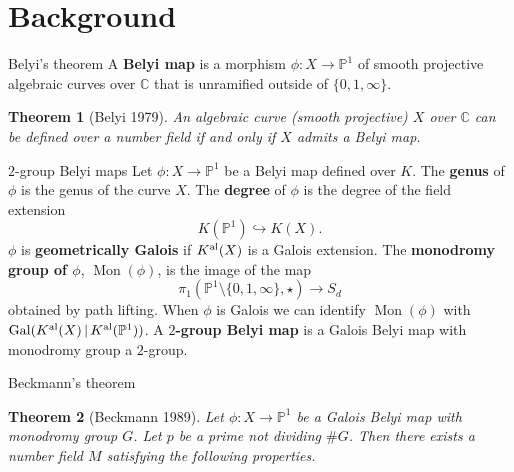 \documentclass[handout,xcolor=dvipsnames]{beamer}
\theoremstyle{plain}
\newtheorem*{thm}{Theorem}
\newcommand{\PP}{\mathbb P}
\newcommand{\CC}{\mathbb C}
\newcommand{\Kal}{{{K}^{\textup{al}}}}
\DeclareMathOperator{\Mon}{Mon}
\DeclareMathOperator{\Gal}{Gal}
\begin{document}
  \section{Background}{
    \begin{frame}{Belyi's theorem}
      A \textbf{Belyi map}
      is a morphism
      $\phi\colon X\to\PP^1$
      of smooth projective algebraic curves
      over $\CC$
      that is unramified outside of
      $\{0,1,\infty\}$.
      \pause
      \begin{thm}[Belyi 1979]
        \vspace{1pt}
        An algebraic curve (smooth projective)
        $X$ over $\CC$ can be defined over a number
        field if and only if $X$ admits a
        Belyi map.
      \end{thm}
    \end{frame}
    \begin{frame}{$2$-group Belyi maps}
      Let $\phi\colon X\to\PP^1$ be a Belyi map
      defined over $K$.
      \pause\newline
      The \textbf{genus} of $\phi$ is the genus
      of the curve $X$.
      \pause\newline
      The \textbf{degree} of $\phi$
      is the degree of the field extension
      \[
        K(\PP^1)\hookrightarrow K(X).
      \]
      \pause
      $\phi$ is \textbf{geometrically Galois}
      if $\Kal(X)$ is a Galois extension.
      \pause\newline
      The \textbf{monodromy group of $\phi$},
      $\Mon(\phi)$,
      is the image of the map
      \[
        \pi_1(\PP^1\setminus\{0,1,\infty\},\star)
        \to S_d
      \]
      obtained by path lifting.
      \pause\newline
      When $\phi$ is Galois we
      can identify $\Mon(\phi)$ with
      $\Gal(\Kal(X)\,|\,\Kal(\PP^1))$.
      \pause\newline
      A \textbf{$2$-group Belyi map} is a
      Galois Belyi map with monodromy group
      a $2$-group.
    \end{frame}
    \begin{frame}{Beckmann's theorem}
      \begin{thm}[Beckmann 1989]
        \vspace{1pt}
        Let $\phi\colon X\to\PP^1$ be a Galois
        Belyi map with monodromy group $G$.
        Let $p$ be a prime not dividing
        $\#G$.
        \pause\newline
        Then there exists a number field $M$
        satisfying the following properties.

\end{thm}
\end{frame}}
\end{document}
